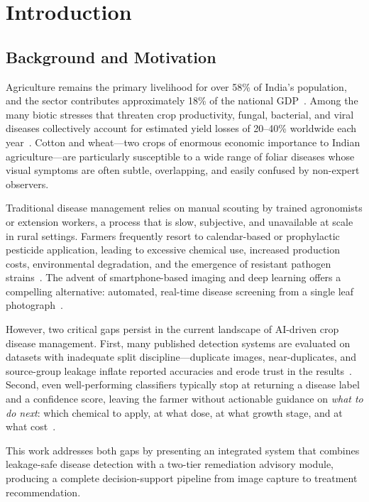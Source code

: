 \documentclass[12pt,a4paper]{report}
\begin{document}
\chapter{Introduction}

\section{Background and Motivation}
Agriculture remains the primary livelihood for over 58\% of India's population, and the sector contributes approximately 18\% of the national GDP~\cite{b8}. Among the many biotic stresses that threaten crop productivity, fungal, bacterial, and viral diseases collectively account for estimated yield losses of 20--40\% worldwide each year~\cite{b8,b9}. Cotton and wheat---two crops of enormous economic importance to Indian agriculture---are particularly susceptible to a wide range of foliar diseases whose visual symptoms are often subtle, overlapping, and easily confused by non-expert observers.

Traditional disease management relies on manual scouting by trained agronomists or extension workers, a process that is slow, subjective, and unavailable at scale in rural settings. Farmers frequently resort to calendar-based or prophylactic pesticide application, leading to excessive chemical use, increased production costs, environmental degradation, and the emergence of resistant pathogen strains~\cite{b10}. The advent of smartphone-based imaging and deep learning offers a compelling alternative: automated, real-time disease screening from a single leaf photograph~\cite{b7,b5}.

However, two critical gaps persist in the current landscape of AI-driven crop disease management. First, many published detection systems are evaluated on datasets with inadequate split discipline---duplicate images, near-duplicates, and source-group leakage inflate reported accuracies and erode trust in the results~\cite{b6}. Second, even well-performing classifiers typically stop at returning a disease label and a confidence score, leaving the farmer without actionable guidance on \textit{what to do next}: which chemical to apply, at what dose, at what growth stage, and at what cost~\cite{b11,b19}.

This work addresses both gaps by presenting an integrated system that combines leakage-safe disease detection with a two-tier remediation advisory module, producing a complete decision-support pipeline from image capture to treatment recommendation.
\end{document}
